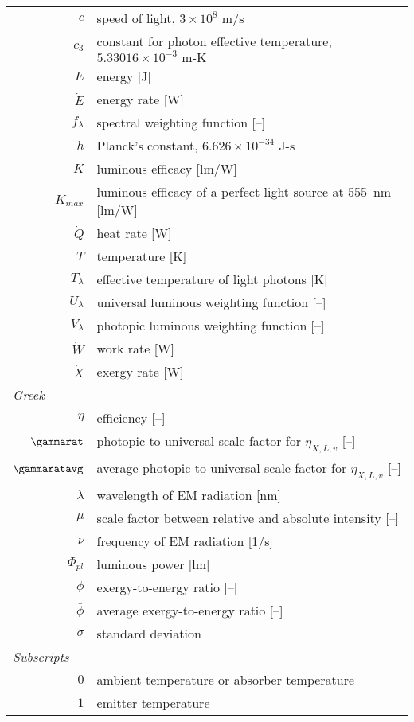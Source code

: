 \begin{center}
\begin{longtable}{r l}
  $c$ & speed of light, $3 \times 10^8 \text{ m/s}$ \\
  $c_3$ & constant for photon effective temperature, $5.33016 \times 10^{-3} \text{ m-K}$ \\
  $E$ & energy [J] \\
  $\dot{E}$ & energy rate [W] \\
  $f_\lambda$ & spectral weighting function [--] \\
  $h$ & Planck's constant, $6.626 \times 10^{-34} \text{ J-s}$ \\
  $K$ & luminous efficacy [lm/W] \\
  $K_{max}$ & luminous efficacy of a perfect light source at 555~nm [lm/W] \\
  $\dot{Q}$ & heat rate [W] \\
  $T$ & temperature [K] \\
  $T_\lambda$ & effective temperature of light photons [K] \\
  $U_\lambda$ & universal luminous weighting function [--] \\
  $V_\lambda$ & photopic luminous weighting function [--] \\
  $\dot{W}$ & work rate [W] \\
  $\dot{X}$ & exergy rate [W] \\
%
\multicolumn{2}{l}{\emph{Greek}} \\ 
%
  $\eta$ & efficiency [--] \\
  $\gammarat$ & photopic-to-universal scale factor for $\eta_{X,L,v}$ [--] \\
  $\gammaratavg$ & average photopic-to-universal scale factor for $\eta_{X,L,v}$ [--] \\
  $\lambda$ & wavelength of EM radiation [nm] \\
  $\mu$ & scale factor between relative and absolute intensity [--] \\
  $\nu$ & frequency of EM radiation [1/s] \\
  $\Phi_{pl}$ & luminous power [lm] \\
  $\phi$ & exergy-to-energy ratio [--] \\
  $\bar{\phi}$ & average exergy-to-energy ratio [--] \\
  $\sigma$ & standard deviation \\
%
\multicolumn{2}{l}{\emph{Subscripts}} \\ 
%
  $0$ & ambient temperature or absorber temperature \\
  $1$ & emitter temperature \\

\end{longtable}
\end{center}

